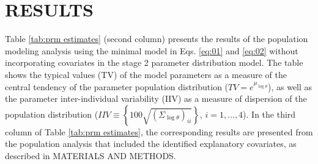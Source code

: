 \documentclass[utf8]{frontiersSCNS} %
\begin{document}
\section{RESULTS}
\vskip 0.5cm
Table \ref{tab:prm estimates} (second column) presents the results of the population modeling analysis using the minimal model in Eqs. \ref{eq:01} and \ref{eq:02} without incorporating covariates in the stage 2 parameter distribution model. The table shows the typical values (TV) of the model parameters as a measure of the central tendency of the parameter population distribution ($TV = {e^{{\mu _{\log \theta }}}}$), as well as the parameter inter-individual variability (IIV) as a measure of dispersion of the population distribution ($IIV \equiv \left\{ {100\sqrt {{{\left( {{\Sigma _{\log \theta }}} \right)}_{ii}}} } \right\},\,i = 1, \ldots ,4$). In the third column of Table \ref{tab:prm estimates}, the corresponding results are presented from the population analysis that included the identified explanatory covariates, as described in MATERIALS AND METHODS.
\end{document}
